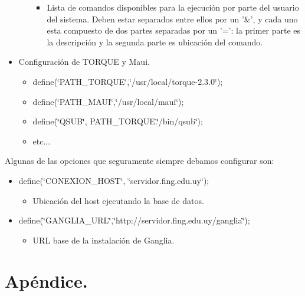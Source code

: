 \documentclass[a4paper,10pt,spanish]{article}
\begin{document}
\begin{itemize}
\begin{itemize}
\begin{itemize}
\item Lista de comandos disponibles para la ejecuci\'{o}n por parte del usuario del sistema. Deben estar separados entre ellos por un '\&', y cada uno esta compuesto de dos partes separadas por un '=': la primer parte es la descripci\'{o}n y la segunda parte es ubicaci\'{o}n del comando.
\end{itemize}

\end{itemize}

\item Configuraci\'{o}n de TORQUE y Maui.

\begin{itemize}
\item define(\char`\"{}PATH\_TORQUE\char`\"{},\char`\"{}/usr/local/torque-2.3.0\char`\"{}); 
\item define(\char`\"{}PATH\_MAUI\char`\"{},\char`\"{}/usr/local/maui\char`\"{});
\item define(\char`\"{}QSUB\char`\"{}, PATH\_TORQUE.\char`\"{}/bin/qsub\char`\"{});
\item etc...
\end{itemize}

\end{itemize}

Algunas de las opciones que seguramente siempre debamos configurar son:

\begin{itemize}
\item define(\char`\"{}CONEXION\_HOST\char`\"{}, \char`\"{}servidor.fing.edu.uy\char`\"{});

\begin{itemize}
\item Ubicaci\'{o}n del host ejecutando la base de datos.
\end{itemize}

\item define(\char`\"{}GANGLIA\_URL\char`\"{},\char`\"{}http://servidor.fing.edu.uy/ganglia\char`\"{});

\begin{itemize}
\item URL base de la instalaci\'{o}n de Ganglia.
\end{itemize}

\end{itemize}

\section{Ap\'{e}ndice.}
\end{document}
